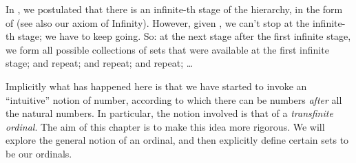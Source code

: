 \documentclass[../../../include/open-logic-section]{subfiles}
\begin{document}

In , we postulated that there is an infinite-th stage
of the hierarchy, in the form of \stagesinf{} (see also our axiom of
Infinity). However, given \stagessucc{}, we can't stop at the
infinite-th stage; we have to keep going. So: at the next stage after
the first infinite stage, we form all possible collections of sets
that were available at the first infinite stage; and repeat; and
repeat; and repeat; \dots

Implicitly what has happened here is that we have started to invoke an
``intuitive'' notion of number, according to which there can be
numbers \emph{after} all the natural numbers. In particular, the
notion involved is that of a \emph{transfinite ordinal}. The aim of
this chapter is to make this idea more rigorous. We will explore the
general notion of an ordinal, and then explicitly define certain sets
to be our ordinals. 
\end{document}
